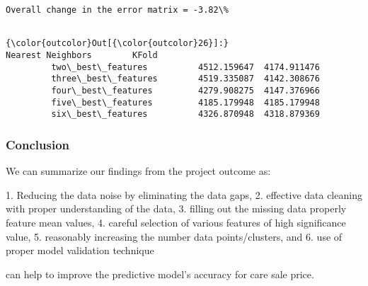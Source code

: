 \documentclass[11pt]{article}
\begin{document}
    \begin{Verbatim}[commandchars=\\\{\}]
Overall change in the error matrix = -3.82\%


    \end{Verbatim}

\begin{Verbatim}[commandchars=\\\{\}]
{\color{outcolor}Out[{\color{outcolor}26}]:}                      Nearest Neighbors        KFold
         two\_best\_features          4512.159647  4174.911476
         three\_best\_features        4519.335087  4142.308676
         four\_best\_features         4279.908275  4147.376966
         five\_best\_features         4185.179948  4185.179948
         six\_best\_features          4326.870948  4318.879369
\end{Verbatim}
            
    \subsubsection{Conclusion}\label{conclusion}
We can summarize our findings from the project outcome as: 

1.	Reducing the data noise by eliminating the data gaps, 
2.	effective data cleaning with proper understanding of the data, 
3.	filling out the missing data properly feature mean values, 
4.	careful selection of various features of high significance value, 
5.	reasonably increasing the number data points/clusters, and 
6.	use of proper model validation technique

can help to improve the predictive model’s accuracy for care sale price. 

    
    
    
    
\end{document}
